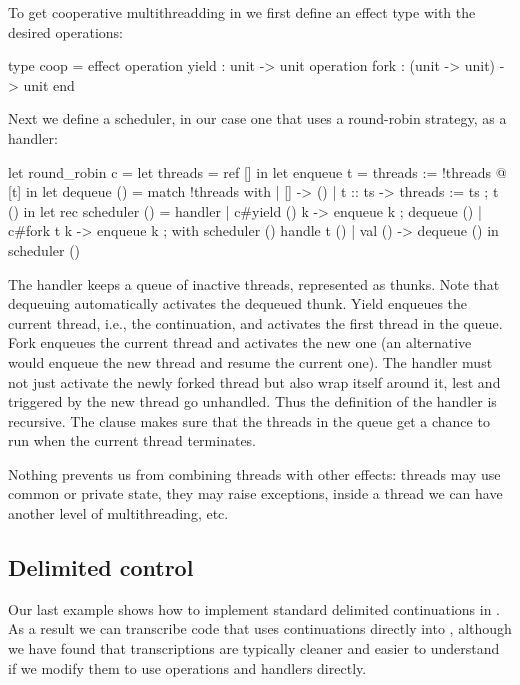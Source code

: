 To get cooperative multithreadding in \eff we first define an effect type with the desired operations:
%
\begin{source}
type coop = effect
  operation yield : unit -> unit
  operation fork : (unit -> unit) -> unit
end
\end{source}
%
Next we define a scheduler, in our case one that uses a round-robin strategy, as a handler:
%
\begin{source}
let round_robin c =
  let threads = ref [] in
  let enqueue t = threads := !threads @ [t] in
  let dequeue () =
    match !threads with
    | [] -> ()
    | t :: ts -> threads := ts ; t ()
  in
  let rec scheduler () = handler
    | c#yield () k -> enqueue k ; dequeue ()
    | c#fork t k ->
        enqueue k ; with scheduler () handle t ()
    | val () -> dequeue ()
  in
    scheduler ()
\end{source}
%
The handler keeps a queue of inactive threads, represented as thunks. Note that dequeuing automatically activates the dequeued thunk. Yield enqueues the current thread, i.e., the continuation, and activates the first thread in the queue. Fork enqueues the current thread and activates the new one (an alternative would enqueue the new thread and resume the current one). The handler must not just activate the newly forked thread but also wrap itself around it, lest  and  triggered by the new thread go unhandled. Thus the definition of the handler is recursive. The  clause makes sure that the threads in the queue get a chance to run when the current thread terminates. 

Nothing prevents us from combining threads with other effects: threads may use common or private state, they may raise exceptions, inside a thread we can have another level of multithreading, etc.

\subsection{Delimited control}
\label{sec:delim-cont}

Our last example shows how to implement standard delimited continuations in \eff. As a result we can transcribe code that uses continuations directly into \eff, although we have found that transcriptions are typically cleaner and easier to understand if we modify them to use operations and handlers directly.

